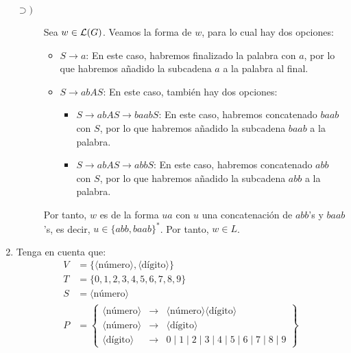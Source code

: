 \begin{ejercicio}
\begin{enumerate}
\begin{description}
            \item[$\supset)$] Sea $w\in\mathcal{L}(G)$. Veamos la forma de $w$, para lo cual hay dos opciones:
            \begin{itemize}
                \item $S\rightarrow a$: En este caso, habremos finalizado la palabra con $a$, por lo que habremos añadido la subcadena $a$ a la palabra al final.
                \item $S \rightarrow abAS$: En este caso, también hay dos opciones:
                \begin{itemize}
                    \item $S \rightarrow abAS \rightarrow baabS$: En este caso, habremos concatenado $baab$ con $S$, por lo que habremos añadido la subcadena $baab$ a la palabra.
                    \item $S \rightarrow abAS \rightarrow abbS$: En este caso, habremos concatenado $abb$ con $S$, por lo que habremos añadido la subcadena $abb$ a la palabra.
                \end{itemize}
            \end{itemize}
            Por tanto, $w$ es de la forma $ua$ con $u$ una concatenación de $abb$'s y $baab$'s, es decir, $u\in\{abb, baab\}^\ast$.
            Por tanto, $w\in L$.
        \end{description}

        \item \label{ej:1.2.b} Tenga en cuenta que:
        \begin{align*}
            V &= \{\langle \text{número} \rangle, \langle \text{dígito} \rangle\} \\
            T &= \{0,1,2,3,4,5,6,7,8,9\} \\
            S &= \langle \text{número} \rangle \\
            P &= \left\{
                \begin{array}{rcl}
                    \langle \text{número} \rangle &\rightarrow & \langle \text{número} \rangle \langle \text{dígito} \rangle \\
                    \langle \text{número} \rangle &\rightarrow & \langle \text{dígito} \rangle \\
                    \langle \text{dígito} \rangle &\rightarrow & 0 \mid 1 \mid 2 \mid 3 \mid 4 \mid 5 \mid 6 \mid 7 \mid 8 \mid 9
                \end{array}
            \right\}
        \end{align*}


\end{enumerate}
\end{ejercicio}
